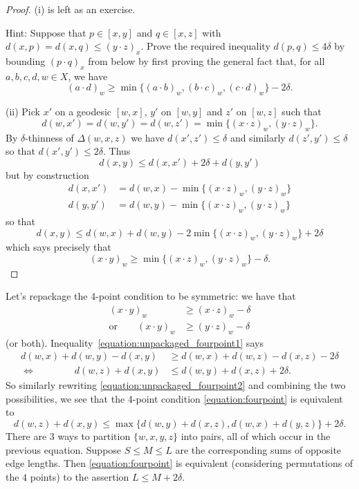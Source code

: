 \begin{proof}
    (i) is left as an exercise.

    Hint: Suppose that $p \in [x, y]$ and $q \in [x, z]$ with $d(x, p) = d(x, q) \leq (y \cdot z)_x$.
    Prove the required inequality $d(p, q) \leq 4\delta$ by bounding $(p \cdot q)_x$ from below by first proving the general fact that, for all $a, b, c, d, w \in X$, we have \[
        (a \cdot d)_w \geq \min\{(a \cdot b)_w, (b \cdot c)_w, (c \cdot d)_w\} - 2\delta.
    \]

    (ii) Pick $x'$ on a geodesic $[w, x]$, $y'$ on $[w, y]$ and $z'$ on $[w, z]$ such that \[
        d(w, x') = d(w, y') = d(w, z') = \min\{ (x \cdot z)_w, (y \cdot z)_w \}.
    \]
    By $\delta$-thinness of $\Delta(w, x, z)$ we have $d(x', z') \leq \delta$ and similarly $d(z', y') \leq \delta$ so that $d(x', y') \leq 2\delta$.
    Thus \[
        d(x, y) \leq d(x, x') + 2\delta + d(y, y')
    \] but by construction
    \begin{align*}
        d(x, x') &= d(w, x) - \min\{ (x \cdot z)_w, (y \cdot z)_w \} \\
        d(y, y') &= d(w, y) - \min\{ (x \cdot z)_w, (y \cdot z)_w \}
    \end{align*}
    so that \[
        d(x, y) \leq d(w, x) + d(w, y) - 2\min\{ (x \cdot z)_w, (y \cdot z)_w \} + 2 \delta
    \] which says precisely that \[
        (x \cdot y)_w \geq \min\{ (x \cdot z)_w, (y \cdot z)_w \} - \delta.
    \]
\end{proof}

Let's repackage the 4-point condition to be symmetric: we have that
\begin{align}
    \label{equation:unpackaged_fourpoint1}
    (x \cdot y)_w
        &\geq (x \cdot z)_w - \delta \\
    \label{equation:unpackaged_fourpoint2}
    \text{or} \qquad (x \cdot y)_w
        &\geq (y \cdot z)_w - \delta
\end{align}
(or both).
Inequality~\eqref{equation:unpackaged_fourpoint1} says
\begin{align*}
    d(w, x) + d(w, y) - d(x, y)
        &\geq d(w, x) + d(w, z) - d(x, z) - 2\delta \\
    \Leftrightarrow \qquad \qquad d(w, z) + d(x, y)
        &\leq d(w, y) + d(x, z) + 2\delta.
\end{align*}
So similarly rewriting \eqref{equation:unpackaged_fourpoint2} and combining the two possibilities, we see that the 4-point condition \eqref{equation:fourpoint} is equivalent to \begin{equation}
    \label{equation:symmetric_fourpoint}
    d(w, z) + d(x, y) \leq \max \{ d(w, y) + d(x, z), d(w, x) + d(y, z) \} + 2\delta. \tag{$\diamond$}
\end{equation}
There are $3$ ways to partition $\{w, x, y, z\}$ into pairs, all of which occur in the previous equation.
Suppose $S \leq M \leq L$ are the corresponding sums of opposite edge lengths.
Then \eqref{equation:fourpoint} is equivalent (considering permutations of the $4$ points) to the assertion $L \leq M + 2\delta$.


